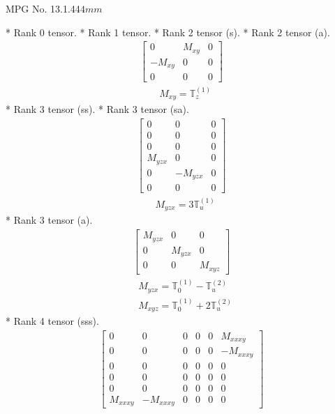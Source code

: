 \documentclass[fleqn,8pt,landscape]{jsarticle}
\begin{document}
\setcounter{MaxMatrixCols}{32}

\renewcommand{\tablename}{Table~}
\renewcommand{\figurename}{Figure~}
\begin{center}
\LARGE
MPG No. 13.1.44\quad$4mm$
\end{center}
* Rank 0 tensor.
* Rank 1 tensor.
* Rank 2 tensor (s).
* Rank 2 tensor (a).
\begin{align*}
\begin{bmatrix} 0 & M_{xy} & 0 \\ - M_{xy} & 0 & 0 \\ 0 & 0 & 0 \end{bmatrix}
\end{align*}
\begin{align*}
& M_{xy} = \mathbb{T}_{z}^{(1)}
\end{align*}
* Rank 3 tensor (ss).
* Rank 3 tensor (sa).
\begin{align*}
\begin{bmatrix} 0 & 0 & 0 \\ 0 & 0 & 0 \\ 0 & 0 & 0 \\ M_{yzx} & 0 & 0 \\ 0 & - M_{yzx} & 0 \\ 0 & 0 & 0 \end{bmatrix}
\end{align*}
\begin{align*}
& M_{yzx} = 3 \mathbb{T}_{u}^{(1)}
\end{align*}
* Rank 3 tensor (a).
\begin{align*}
\begin{bmatrix} M_{yzx} & 0 & 0 \\ 0 & M_{yzx} & 0 \\ 0 & 0 & M_{xyz} \end{bmatrix}
\end{align*}
\begin{align*}
& M_{yzx} = \mathbb{T}_{0}^{(1)} - \mathbb{T}_{u}^{(2)} \\
& M_{xyz} = \mathbb{T}_{0}^{(1)} + 2 \mathbb{T}_{u}^{(2)}
\end{align*}
* Rank 4 tensor (sss).
\begin{align*}
\begin{bmatrix} 0 & 0 & 0 & 0 & 0 & M_{xxxy} \\ 0 & 0 & 0 & 0 & 0 & - M_{xxxy} \\ 0 & 0 & 0 & 0 & 0 & 0 \\ 0 & 0 & 0 & 0 & 0 & 0 \\ 0 & 0 & 0 & 0 & 0 & 0 \\ M_{xxxy} & - M_{xxxy} & 0 & 0 & 0 & 0 \end{bmatrix}
\end{align*}
\end{document}
